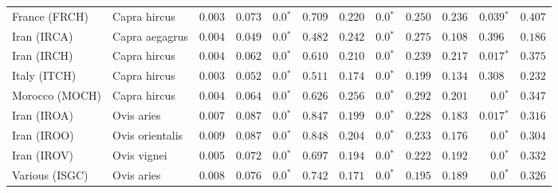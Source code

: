 \documentclass[9pt,twocolumn,twoside,lineno]{pnas-new}
\begin{document}
\begin{table*}[tb]
\begin{adjustbox}{width=17.8cm}
\begin{tabular}{||l|l|r||r|r|r||r|r|r||r|r|r||}
              \rowcolor{LIGHTGREY} France (FRCH)                  & Capra hircus        & $ 0.003$ & $ 0.073$ & $\bm{0.0{^*}}$                  & $ 0.709$                                                                     & $ 0.220$                      & $\bm{0.0{^*}}$ & $ 0.250$ & $ 0.236$ & $\bm{ 0.039{^*}}$ & $ 0.407$ \\
              \rowcolor{LIGHTGREY} Iran (IRCA)                    & Capra aegagrus      & $ 0.004$ & $ 0.049$ & $\bm{0.0{^*}}$                  & $ 0.482$                                                                     & $ 0.242$                      & $\bm{0.0{^*}}$ & $ 0.275$ & $ 0.108$ & $ 0.396~~$ & $ 0.186$ \\
              \rowcolor{LIGHTGREY} Iran (IRCH)                    & Capra hircus        & $ 0.004$ & $ 0.062$ & $\bm{0.0{^*}}$    & $ 0.610$                                                                     & $ 0.210$                      & $\bm{0.0{^*}}$ & $ 0.239$ & $ 0.217$ & $\bm{ 0.017{^*}}$ & $ 0.375$ \\
              \rowcolor{LIGHTGREY} Italy (ITCH)                   & Capra hircus        & $ 0.003$ & $ 0.052$ & $\bm{0.0{^*}}$    & $ 0.511$                                                                     & $ 0.174$                      & $\bm{0.0{^*}}$ & $ 0.199$ & $ 0.134$ & $ 0.308~~$ & $ 0.232$ \\
              \rowcolor{LIGHTGREY} Morocco (MOCH)                 & Capra hircus        & $ 0.004$ & $ 0.064$ & $\bm{0.0{^*}}$                  & $ 0.626$                                                                     & $ 0.256$                      & $\bm{0.0{^*}}$ & $ 0.292$ & $ 0.201$ & $\bm{0.0{^*}}$ & $ 0.347$ \\
              Iran (IROA)                                         & Ovis aries          & $ 0.007$ & $ 0.087$ & $\bm{0.0{^*}}$    & $ 0.847$ & $ 0.199$ & $\bm{0.0{^*}}$ & $ 0.228$ & $ 0.183$ & $\bm{ 0.017{^*}}$ & $ 0.316$ \\
              Iran (IROO)                                         & Ovis orientalis     & $ 0.009$ & $ 0.087$ & $\bm{0.0{^*}}$    & $ 0.848$ & $ 0.204$ & $\bm{0.0{^*}}$ & $ 0.233$ & $ 0.176$ & $\bm{0.0{^*}}$ & $ 0.304$ \\
              Iran (IROV)                                         & Ovis vignei         & $ 0.005$ & $ 0.072$ & $\bm{0.0{^*}}$    & $ 0.697$ & $ 0.194$ & $\bm{0.0{^*}}$ & $ 0.222$ & $ 0.192$ & $\bm{0.0{^*}}$ & $ 0.332$ \\
              Various (ISGC)                                      & Ovis aries          & $ 0.008$ & $ 0.076$ & $\bm{0.0{^*}}$    & $ 0.742$ & $ 0.171$ & $\bm{0.0{^*}}$ & $ 0.195$ & $ 0.189$ & $\bm{0.0{^*}}$ & $ 0.326$ \\

\end{tabular}
\end{adjustbox}
\end{table*}
\end{document}
